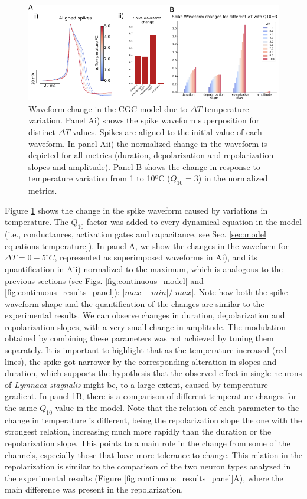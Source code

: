 \begin{figure}[hbt!]
	\centering    
	\includegraphics[width=\textwidth]{img/laser/Figure5.pdf}
	\caption{Waveform change in the CGC-model due to $\Delta T$ temperature variation. Panel Ai) shows the spike waveform superposition for distinct $\Delta T$ values. Spikes are aligned to the initial value of each waveform. In panel Aii) the normalized change in the waveform is depicted for all metrics (duration, depolarization and repolarization slopes and amplitude). Panel B shows the change in response to temperature variation from 1 to 10ºC ($Q_{10}=3$) in the normalized metrics.}
	\label{fig:temperature model}
\end{figure}

Figure \ref{fig:temperature model} shows the change in the spike waveform caused by variations in temperature. The $Q_{10}$ factor was added to every dynamical equation in the model (i.e., conductances, activation gates and capacitance, see Sec. \ref{sec:model equations temperature}). In panel A, we show the changes in the waveform for $\Delta T=0-5^{\circ}C$, represented as superimposed waveforms in Ai), and its quantification in Aii) normalized to the maximum, which is analogous to the previous sections (see Figs. \ref{fig:continuous_model} and \ref{fig:continuous_results_panel}): $|max-min|/|max|$. Note how both the spike waveform shape and the quantification of the changes are similar to the experimental results. We can observe changes in duration, depolarization and repolarization slopes, with a very small change in amplitude.
The modulation obtained by combining these parameters was not achieved by tuning them separately. It is important to highlight that as the temperature increased (red lines), the spike got narrower by the corresponding alteration in slopes and duration, which supports the hypothesis that the observed effect in single neurons of \textit{Lymnaea stagnalis} might be, to a large extent, caused by temperature gradient. In panel \ref{fig:temperature model}B, there is a comparison of different temperature changes for the same $Q_{10}$ value in the model. Note that the relation of each parameter to the change in temperature is different, being the repolarization slope the one with the strongest relation, increasing much more rapidly than the duration or the repolarization slope. This points to a main role in the change from some of the channels, especially those that have more tolerance to change. This relation in the repolarization is similar to the comparison of the two neuron types analyzed in the experimental results (Figure \ref{fig:continuous_results_panel}A), where the main difference was present in the repolarization.



